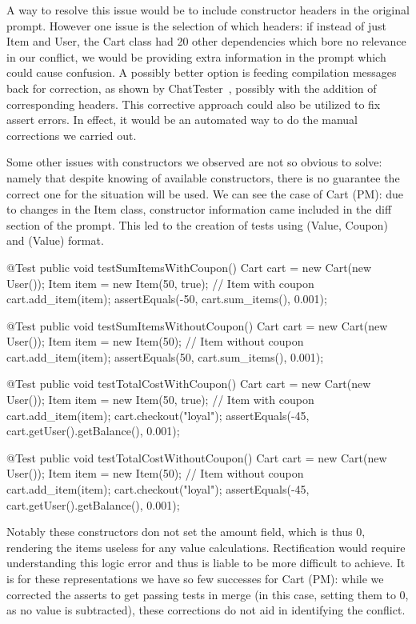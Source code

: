 A way to resolve this issue would be to include constructor headers in the original prompt. However one issue is the selection of which
headers: if instead of just Item and User, the Cart class had 20 other dependencies which bore no relevance in our conflict, we would be
providing extra information in the prompt which could cause confusion. A possibly better option is feeding compilation messages back for correction,
as shown by ChatTester~\cite{kn:chattester}, possibly with the addition of corresponding headers. This corrective approach could also be utilized
to fix assert errors. In effect, it would be an automated way to do the manual corrections we carried out.

Some other issues with constructors we observed are not so obvious to solve: namely that despite knowing of available constructors, there is no guarantee
the correct one for the situation will be used. We can see the case of Cart (PM): due to changes in the Item class, constructor information came included
in the diff section of the prompt. This led to the creation of tests using (Value, Coupon) and (Value) format.
\begin{response}
    @Test
    public void testSumItemsWithCoupon() {
        Cart cart = new Cart(new User());
        Item item = new Item(50, true); // Item with coupon
        cart.add_item(item);
        assertEquals(-50, cart.sum_items(), 0.001);
    }

    @Test
    public void testSumItemsWithoutCoupon() {
        Cart cart = new Cart(new User());
        Item item = new Item(50); // Item without coupon
        cart.add_item(item);
        assertEquals(50, cart.sum_items(), 0.001);
    }

    @Test
    public void testTotalCostWithCoupon() {
        Cart cart = new Cart(new User());
        Item item = new Item(50, true); // Item with coupon
        cart.add_item(item);
        cart.checkout("loyal");
        assertEquals(-45, cart.getUser().getBalance(), 0.001);
    }

    @Test
    public void testTotalCostWithoutCoupon() {
        Cart cart = new Cart(new User());
        Item item = new Item(50); // Item without coupon
        cart.add_item(item);
        cart.checkout("loyal");
        assertEquals(-45, cart.getUser().getBalance(), 0.001);
    }
\end{response}
Notably these constructors don not set the amount field, which is thus 0, rendering the items useless for any value calculations.
Rectification would require understanding this logic error and thus is liable to be more difficult to achieve. It is for these representations
we have so few successes for Cart (PM): while we corrected the asserts to get passing tests in merge (in this case, setting them to 0, as no
value is subtracted), these corrections do not aid in identifying the conflict.

